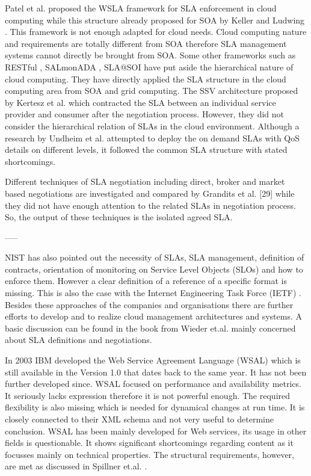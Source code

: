 Patel et al. \cite{Patel2009ServiceLA} proposed the WSLA framework for SLA enforcement in cloud computing while this structure already proposed for SOA by Keller and Ludwing \cite{Ludwig03WSLA}. This framework is not enough adapted for cloud needs. Cloud computing nature and requirements are totally different from SOA therefore SLA management systems cannot directly be brought from SOA. Some other frameworks such as RESTful \cite{Kubert:2011:RIW:1967428.1967444}, SALmonADA \cite{6225938}, SLA@SOI \cite{slasoi2011} have put aside the hierarchical nature of cloud computing. They have directly applied the SLA structure in the cloud computing area from SOA and grid computing. The SSV architecture proposed by Kertesz et al. \cite{5739040}which contracted the SLA between an individual service provider and consumer after the negotiation process. However, they did not consider the hierarchical relation of SLAs in the cloud environment. Although a research by Undheim et al. \cite{6076508} attempted to deploy the on demand SLAs with QoS details on different levels, it followed the common SLA structure with stated shortcomings. 

Different techniques of SLA negotiation including direct, broker and market based negotiations are investigated and compared by Grandits et al. [29] while they did not have enough attention to the related SLAs in negotiation process. So, the output of these techniques is the isolated agreed SLA. 

-----

NIST \cite{Liu2011} has also pointed out the necessity of SLAs, SLA management, definition of contracts, orientation of monitoring on Service Level Objects (SLOs) and how to enforce them. However a clear definition of a reference of a specific format is missing. This is also the case with the Internet Engineering Task Force (IETF) \cite{Khasnabish2010}. Besides these approaches of the companies and organisations there are further efforts to develop and to realize cloud management architectures and systems. A basic discussion can be found in the book from Wieder et.al. \cite{Wieder2011} mainly concerned about SLA definitions and negotiations.

In 2003 IBM developed the Web Service Agreement Language (WSAL) \cite{Ludwig03WSLA} which is still available in the Version 1.0 that dates back to the same year. It has not been further developed since. WSAL focused on performance and availability metrics. It seriously lacks expression therefore it is not powerful enough. The required flexibility is also missing which is needed for dynamical changes at run time. It is closely connected to their XML schema and not very useful to determine conclusion.
WSAL has been mainly developed for Web services, its usage in other fields is questionable. It shows significant shortcomings regarding content as it focusses mainly on technical properties. The structural requirements, however, are met as discussed in Spillner et.al. \cite{Spillner2009}.

